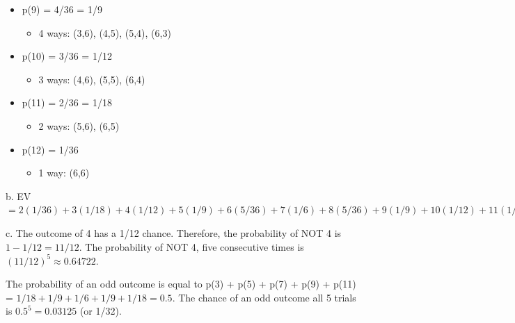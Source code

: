 \documentclass[a4paper]{article}
\begin{document}
\begin{itemize}
    \item p(9) = 4/36 = 1/9
    \begin{itemize}
        \item 4 ways: (3,6), (4,5), (5,4), (6,3)
    \end{itemize}   
    \item p(10) = 3/36 = 1/12
    \begin{itemize}
        \item 3 ways: (4,6), (5,5), (6,4)
    \end{itemize} 
    \item p(11) = 2/36 = 1/18
    \begin{itemize}
        \item 2 ways: (5,6), (6,5)
    \end{itemize}
    \item p(12) = 1/36
    \begin{itemize}
        \item 1 way: (6,6)
    \end{itemize}
\end{itemize}

\noindent
b. EV $= 2(1/36) + 3(1/18) + 4(1/12) + 5(1/9) + 6(5/36) + 7(1/6) + 8(5/36) + 9(1/9) + 10(1/12) + 11(1/18) + 12(1/36) = 7$

\medskip
\noindent
c. The outcome of 4 has a 1/12 chance. Therefore, the probability of NOT 4 is $1-1/12=11/12$. The probability of NOT 4, five consecutive times is $(11/12)^5 \approx 0.64722$.

\medskip
\noindent
The probability of an odd outcome is equal to p(3) + p(5) + p(7) + p(9) + p(11) = $1/18+1/9+1/6+1/9+1/18=0.5$. The chance of an odd outcome all 5 trials is $0.5^5=0.03125$ (or 1/32).
\end{document}
